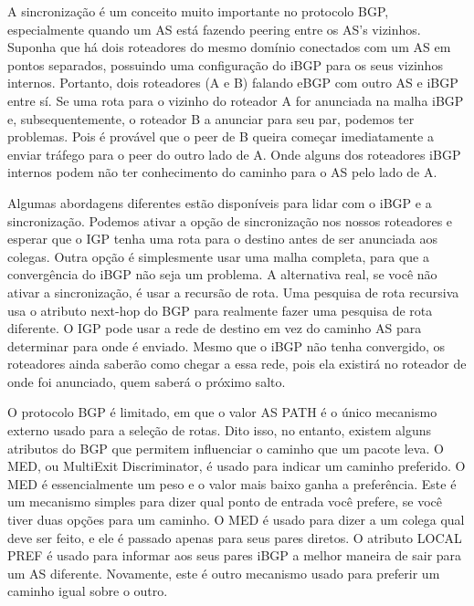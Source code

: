 \documentclass[12pt,a4paper]{report}
\begin{document}
A sincroniza\c{c}\~ao \'e um conceito muito importante no protocolo BGP, especialmente quando um AS est\'a fazendo peering entre os AS's vizinhos. Suponha que h\'a dois roteadores do mesmo dom\'inio conectados com um AS em pontos separados, possuindo uma configura\c{c}\~ao do iBGP para os seus vizinhos internos. Portanto, dois roteadores (A e B) falando eBGP com outro AS e iBGP entre s\'i. Se uma rota para o vizinho do roteador A for anunciada na malha iBGP e, subsequentemente, o roteador B a anunciar para seu par, podemos ter problemas. Pois \'e prov\'avel que o peer de B queira come\c{c}ar imediatamente a enviar tr\'afego para o peer do outro lado de A. Onde alguns dos roteadores iBGP internos podem n\~ao ter conhecimento do caminho para o AS pelo lado de A.

Algumas abordagens diferentes est\~ao dispon\'iveis para lidar com o iBGP e a sincroniza\c{c}\~ao. Podemos ativar a op\c{c}\~ao de sincroniza\c{c}\~ao nos nossos roteadores e esperar que o IGP tenha uma rota para o destino antes de ser anunciada aos colegas. Outra op\c{c}\~ao \'e simplesmente usar uma malha completa, para que a converg\^encia do iBGP n\~ao seja um problema. A alternativa real, se voc\^e n\~ao ativar a sincroniza\c{c}\~ao, \'e usar a recurs\~ao de rota. Uma pesquisa de rota recursiva usa o atributo next-hop do BGP para realmente fazer uma pesquisa de rota diferente. O IGP pode usar a rede de destino em vez do caminho AS para determinar para onde \'e enviado. Mesmo que o iBGP n\~ao tenha convergido, os roteadores ainda saber\~ao como chegar a essa rede, pois ela existir\'a no roteador de onde foi anunciado, quem saber\'a o pr\'oximo salto.\cite{rfc4271}

O protocolo BGP \'e limitado, em que o valor AS PATH \'e o \'unico mecanismo externo usado para a sele\c{c}\~ao de rotas. Dito isso, no entanto, existem alguns atributos do BGP que permitem influenciar o caminho que um pacote leva. O MED, ou MultiExit Discriminator, \'e usado para indicar um caminho preferido. O MED \'e essencialmente um peso e o valor mais baixo ganha a prefer\^encia. Este \'e um mecanismo simples para dizer qual ponto de entrada voc\^e prefere, se voc\^e tiver duas op\c{c}\~oes para um caminho. O MED \'e usado para dizer a um colega qual deve ser feito, e ele \'e passado apenas para seus pares diretos. O atributo LOCAL PREF \'e usado para informar aos seus pares iBGP a melhor maneira de sair para um AS diferente. Novamente, este \'e outro mecanismo usado para preferir um caminho igual sobre o outro.
\end{document}
